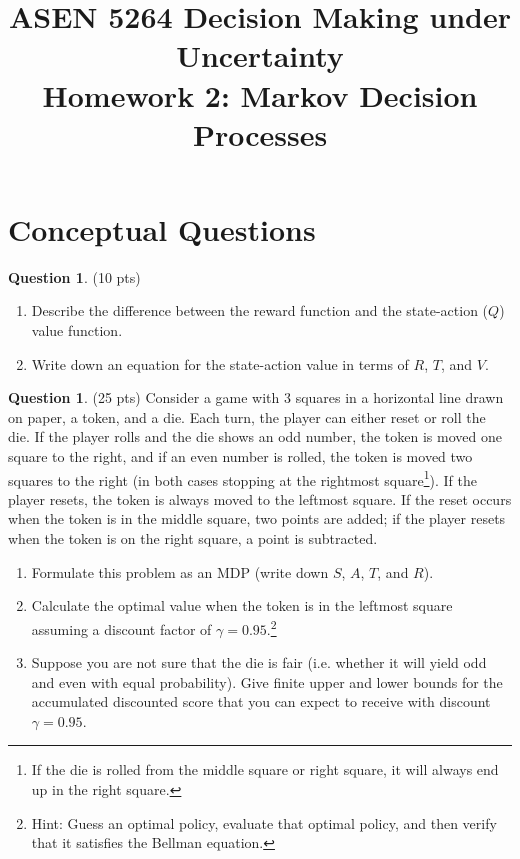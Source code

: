 \documentclass{article}
\title{ASEN 5264 Decision Making under Uncertainty\\
       Homework 2: Markov Decision Processes}
\theoremstyle{definition}
\newtheorem{question}[thm]{Question}
\begin{document}
\maketitle

\section*{Conceptual Questions}

\begin{question}\label{q:q} (10 pts)
    \begin{enumerate}[label=\alph*)]
        \item Describe the difference between the reward function and the state-action ($Q$) value function.
        \item Write down an equation for the state-action value in terms of $R$, $T$, and $V$.
    \end{enumerate}
\end{question}

\begin{question}\label{q:mdp} (25 pts)
    Consider a game with 3 squares in a horizontal line drawn on paper, a token, and a die. Each turn, the player can either reset or roll the die. If the player rolls and the die shows an odd number, the token is moved one square to the right, and if an even number is rolled, the token is moved two squares to the right (in both cases stopping at the rightmost square\footnote{If the die is rolled from the middle square or right square, it will always end up in the right square.}). If the player resets, the token is always moved to the leftmost square. If the reset occurs when the token is in the middle square, two points are added; if the player resets when the token is on the right square, a point is subtracted.
    \begin{enumerate}[label=\alph*)]
        \item Formulate this problem as an MDP (write down $S$, $A$, $T$, and $R$).
        \item Calculate the optimal value when the token is in the leftmost square assuming a discount factor of $\gamma = 0.95$.\footnote{Hint: Guess an optimal policy, evaluate that optimal policy, and then verify that it satisfies the Bellman equation.}
        \item Suppose you are not sure that the die is fair (i.e. whether it will yield odd and even with equal probability). Give finite upper and lower bounds for the accumulated discounted score that you can expect to receive with discount $\gamma = 0.95$.
    \end{enumerate}
\end{question}
\end{document}
